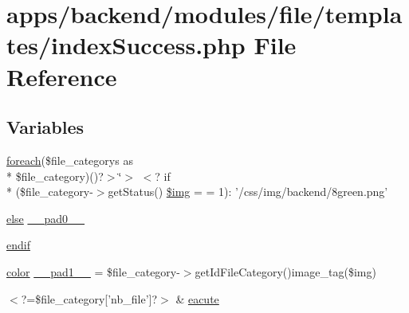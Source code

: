 \hypertarget{backend_2modules_2file_2templates_2index_success_8php}{\section{apps/backend/modules/file/templates/index\-Success.php File Reference}
\label{backend_2modules_2file_2templates_2index_success_8php}
}
\subsection*{Variables}
\begin{DoxyCompactItemize}
\item 
\hyperlink{presse_2modules_2news_2templates_2index_success_8php_abc56db52b2e9a59bcd5c9e45ac5cb332}{foreach}(\$file\-\_\-categorys as \\*
\$file\-\_\-category)()?$>$\char`\"{}$>$ $<$? if \\*
(\$file\-\_\-category-\/$>$get\-Status() \hyperlink{backend_2modules_2file_2templates_2index_success_8php_a0829c4f6ce824318b248e67e032d85d3}{\$img} = = 1)\-: '/css/img/backend/8green.\-png'
\item 
\hyperlink{live_2modules_2team_2templates_2management_success_8php_a0544c3fe466e421738dae463968b70ba}{else} \hyperlink{backend_2modules_2file_2templates_2index_success_8php_a8e01dcc96c43199448ee66f7c2ae8ea6}{\-\_\-\-\_\-pad0\-\_\-\-\_\-}
\item 
\hyperlink{backend_2modules_2file_2templates_2index_success_8php_a82cd33ca97ff99f2fcc5e9c81d65251b}{endif}
\item 
\hyperlink{preview_success_8php_ac04e2a463631b69c8f70784275a056d6}{color} \hyperlink{backend_2modules_2file_2templates_2index_success_8php_abcb9288aac8a832fb63f4585c30ea142}{\-\_\-\-\_\-pad1\-\_\-\-\_\-} = \$file\-\_\-category-\/$>$get\-Id\-File\-Category()image\-\_\-tag(\$img)
\item 
$<$?=\$file\-\_\-category\mbox{[}'nb\-\_\-file'\mbox{]}?$>$ \& \hyperlink{backend_2modules_2file_2templates_2index_success_8php_a72db58f133163d66d5c2aad88b34f054}{eacute}
\end{DoxyCompactItemize}



